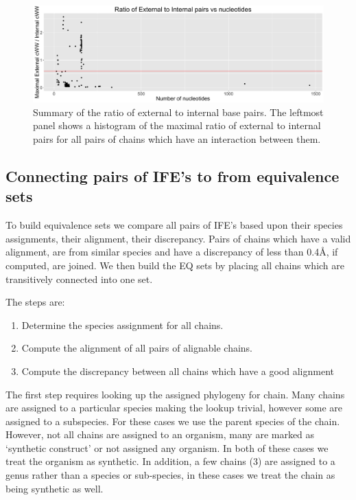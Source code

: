 \begin{figure}
  \includegraphics[width=\linewidth]{chapter-3/figs/internal-external}
  \caption{Summary of the ratio of external to internal base pairs. The leftmost
    panel shows a histogram of the maximal ratio of external to internal pairs
  for all pairs of chains which have an interaction between them. }
  \label{fig:ext-vs-int}
\end{figure}

\subsection{Connecting pairs of IFE's to from equivalence sets}

To build equivalence sets we compare all pairs of IFE’s based upon their species
assignments, their alignment, their discrepancy. Pairs of chains which have a
valid alignment, are from similar species and have a discrepancy of less than
0.4{\AA}, if computed, are joined. We then build the EQ sets by placing all chains
which are transitively connected into one set.

The steps are:
\begin{enumerate}
  \item Determine the species assignment for all chains.
  \item Compute the alignment of all pairs of alignable chains.
  \item Compute the discrepancy between all chains which have a good alignment
\end{enumerate}

The first step requires looking up the assigned phylogeny for chain. Many chains
are assigned to a particular species making the lookup trivial, however some are
assigned to a subspecies. For these cases we use the parent species of the
chain. However, not all chains are assigned to an organism, many are marked as
‘synthetic construct’ or not assigned any organism. In both of these cases we
treat the organism as synthetic. In addition, a few chains (3) are assigned to a
genus rather than a species or sub-species, in these cases we treat the chain as
being synthetic as well.

